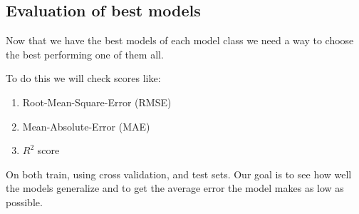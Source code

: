 \documentclass[11pt]{article}
\begin{document}
				\begin{table}[H]
					\centering
					\caption{Best Gradient Boosting hyperparameters for apartment sale price prediction}
					\label{tab:best_gb_sales}
					
				\end{table}

				\begin{table}[H]
					\centering
					\caption{Best Gradient Boosting hyperparameters for apartment rental price prediction}
					\label{tab:best_gb_rents}
					
				\end{table}

		\subsection{Evaluation of best models}
			\noindent Now that we have the best models of each model class we need a way to choose the best performing one of them all. \newline

			\noindent To do this we will check scores like:
			\begin{enumerate}
				\item Root-Mean-Square-Error (RMSE)
				\item Mean-Absolute-Error (MAE)
				\item $R^2$ score
			\end{enumerate}

			\noindent On both train, using cross validation, and test sets. Our goal is to see how well the models generalize and to get the average error the model makes as low as possible.

			\begin{table}[h]
				\centering
				
				\caption{Cross-validation and test $R^2$ score for sales models}
				\label{tab:model_performance_sales_R2}
			\end{table}

			\begin{table}[h]
				\centering
				
				\caption{Cross-validation and test Negative Mean Absolute Error score for sales models}
				\label{tab:model_performance_sales_NMAE}
			\end{table}

			\begin{table}[H]
				\centering
				
				\caption{Cross-validation and test Negative Root Mean Square Error score for sales models}
				\label{tab:model_performance_sales_NRMSE}
			\end{table}
\end{document}
